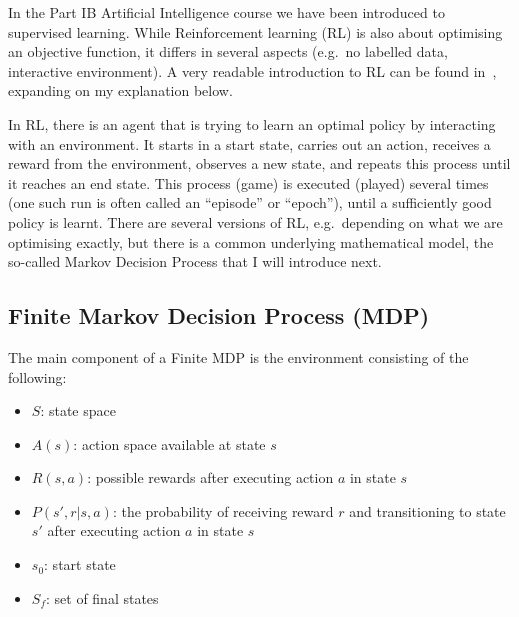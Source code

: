 In the Part IB Artificial Intelligence course we have been introduced to supervised learning. While Reinforcement learning (RL) is also about optimising an objective function, it differs in several aspects (e.g.\ no labelled data, interactive environment). A very readable introduction to RL can be found in~\cite{sutton2018RLbook}, expanding on my explanation below.


In RL, there is an agent that is trying to learn an optimal policy by interacting with an environment. It starts in a start state, carries out an action, receives a reward from the environment, observes a new state, and repeats this process until it reaches an end state. This process (game) is executed (played) several times (one such run is often called an ``episode'' or ``epoch''), until a sufficiently good policy is learnt. There are several versions of RL, e.g.\ depending on what we are optimising exactly, but there is a common underlying mathematical model, the so-called Markov Decision Process that I will introduce next.

\subsection{Finite Markov Decision Process (MDP)}


The main component of a Finite MDP is the environment consisting of the following:
\begin{itemize}[itemsep=0pt]
    \item  $S$: state space
    \item
    $A(s)$: action space available at state $s$
    \item
    $R(s, a)$: possible rewards after executing action $a$ in state $s$
    \item
    $P(s', r | s, a)$: the probability of receiving reward $r$ and transitioning to state $s'$ after executing action $a$ in state $s$
    \item
    $s_0$: start state
    \item
    $S_f$: set of final states
\end{itemize} 


